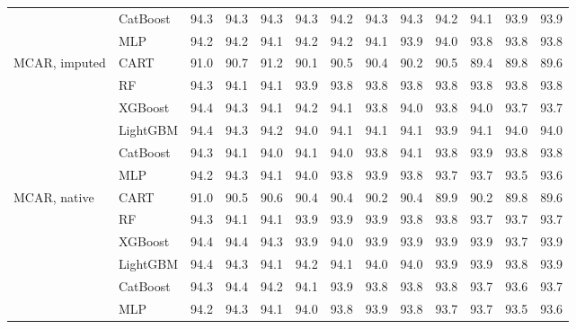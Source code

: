 \begin{table}[p]
\begin{tabular}{@{}llrrrrrrrrrrr@{}}
 & CatBoost & 94.3 & 94.3 & 94.3 & 94.3 & 94.2 & 94.3 & 94.3 & 94.2 & 94.1 & 93.9 & 93.9 \\
 & MLP & 94.2 & 94.2 & 94.1 & 94.2 & 94.2 & 94.1 & 93.9 & 94.0 & 93.8 & 93.8 & 93.8 \\
\midrule
MCAR, imputed & CART & 91.0 & 90.7 & 91.2 & 90.1 & 90.5 & 90.4 & 90.2 & 90.5 & 89.4 & 89.8 & 89.6 \\
 & RF & 94.3 & 94.1 & 94.1 & 93.9 & 93.8 & 93.8 & 93.8 & 93.8 & 93.8 & 93.8 & 93.8 \\
 & XGBoost & 94.4 & 94.3 & 94.1 & 94.2 & 94.1 & 93.8 & 94.0 & 93.8 & 94.0 & 93.7 & 93.7 \\
 & LightGBM & 94.4 & 94.3 & 94.2 & 94.0 & 94.1 & 94.1 & 94.1 & 93.9 & 94.1 & 94.0 & 94.0 \\
 & CatBoost & 94.3 & 94.1 & 94.0 & 94.1 & 94.0 & 93.8 & 94.1 & 93.8 & 93.9 & 93.8 & 93.8 \\
 & MLP & 94.2 & 94.3 & 94.1 & 94.0 & 93.8 & 93.9 & 93.8 & 93.7 & 93.7 & 93.5 & 93.6 \\
\midrule
MCAR, native & CART & 91.0 & 90.5 & 90.6 & 90.4 & 90.4 & 90.2 & 90.4 & 89.9 & 90.2 & 89.8 & 89.6 \\
 & RF & 94.3 & 94.1 & 94.1 & 93.9 & 93.9 & 93.9 & 93.8 & 93.8 & 93.7 & 93.7 & 93.7 \\
 & XGBoost & 94.4 & 94.4 & 94.3 & 93.9 & 94.0 & 93.9 & 93.9 & 93.9 & 93.9 & 93.7 & 93.9 \\
 & LightGBM & 94.4 & 94.3 & 94.1 & 94.2 & 94.1 & 94.0 & 94.0 & 93.9 & 93.9 & 93.8 & 93.9 \\
 & CatBoost & 94.3 & 94.4 & 94.2 & 94.1 & 93.9 & 93.8 & 93.8 & 93.8 & 93.7 & 93.6 & 93.7 \\
 & MLP & 94.2 & 94.3 & 94.1 & 94.0 & 93.8 & 93.9 & 93.8 & 93.7 & 93.7 & 93.5 & 93.6 \\
\bottomrule
\end{tabular}
\end{table}

